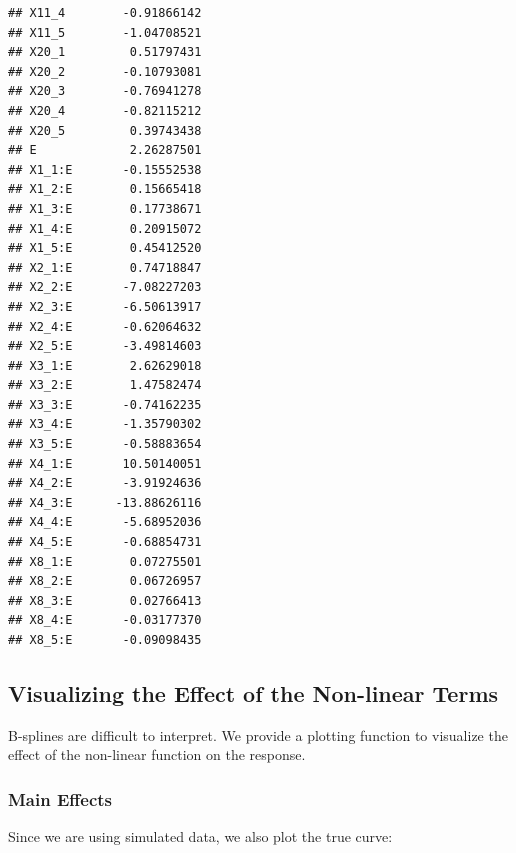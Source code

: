 \documentclass[12pt,letter]{article}\usepackage[]{graphicx}\usepackage[]{color}
\makeatletter
\newenvironment{kframe}{%
 \def\at@end@of@kframe{}%
 \ifinner\ifhmode%
  \def\at@end@of@kframe{\end{minipage}}%
  \begin{minipage}{\columnwidth}%
 \fi\fi%
 \def\FrameCommand##1{\hskip\@totalleftmargin \hskip-\fboxsep
 \colorbox{shadecolor}{##1}\hskip-\fboxsep
     \hskip-\linewidth \hskip-\@totalleftmargin \hskip\columnwidth}%
 \MakeFramed {\advance\hsize-\width
   \@totalleftmargin\z@ \linewidth\hsize
   \@setminipage}}%
 {\par\unskip\endMakeFramed%
 \at@end@of@kframe}
\newenvironment{knitrout}{}{} %
\makeatother
\begin{document}
\begin{knitrout}
\begin{kframe}
\begin{verbatim}
## X11_4        -0.91866142
## X11_5        -1.04708521
## X20_1         0.51797431
## X20_2        -0.10793081
## X20_3        -0.76941278
## X20_4        -0.82115212
## X20_5         0.39743438
## E             2.26287501
## X1_1:E       -0.15552538
## X1_2:E        0.15665418
## X1_3:E        0.17738671
## X1_4:E        0.20915072
## X1_5:E        0.45412520
## X2_1:E        0.74718847
## X2_2:E       -7.08227203
## X2_3:E       -6.50613917
## X2_4:E       -0.62064632
## X2_5:E       -3.49814603
## X3_1:E        2.62629018
## X3_2:E        1.47582474
## X3_3:E       -0.74162235
## X3_4:E       -1.35790302
## X3_5:E       -0.58883654
## X4_1:E       10.50140051
## X4_2:E       -3.91924636
## X4_3:E      -13.88626116
## X4_4:E       -5.68952036
## X4_5:E       -0.68854731
## X8_1:E        0.07275501
## X8_2:E        0.06726957
## X8_3:E        0.02766413
## X8_4:E       -0.03177370
## X8_5:E       -0.09098435
\end{verbatim}
\end{kframe}
\end{knitrout}



\subsection{Visualizing the Effect of the Non-linear Terms}

B-splines are difficult to interpret. We provide a plotting function to visualize the effect of the non-linear function on the response.

\subsubsection{Main Effects}

Since we are using simulated data, we also plot the true curve:
\end{document}
